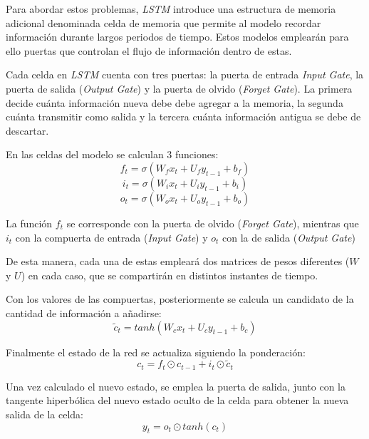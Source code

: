 Para abordar estos problemas, \textit{LSTM} introduce una estructura de memoria adicional denominada
celda de memoria que permite al modelo recordar información durante largos periodos de tiempo. Estos 
modelos emplearán para ello puertas que controlan el flujo de información dentro de estas.

Cada celda en \textit{LSTM} cuenta con tres puertas: la puerta de entrada \textit{Input Gate}, la puerta de salida 
(\textit{Output Gate}) y la puerta de olvido (\textit{Forget Gate}). La primera decide
cuánta información nueva debe debe agregar a la memoria, la segunda cuánta transmitir como salida y 
la tercera cuánta información antigua se debe de descartar.

En las celdas del modelo se calculan 3 funciones:
\begin{equation}
    f_t = \sigma (W_{f} x_t + U_{f} y_{t-1} + b_f)
\end{equation}
\begin{equation}
    i_t = \sigma (W_{i} x_t + U_{i} y_{t-1} + b_i)
\end{equation}
\begin{equation}    
    o_t = \sigma (W_{o} x_t + U_{o} y_{t-1} + b_o)
\end{equation}

La función \(f_t\) se corresponde con la puerta de olvido (\textit{Forget Gate}), mientras que 
\(i_t\) con la compuerta de entrada (\textit{Input Gate}) y \(o_t\) con la de salida (\textit{Output
Gate})

De esta manera, cada una de estas empleará dos matrices de pesos diferentes (\(W\) y \(U\)) en cada caso, que se compartirán
en distintos instantes de tiempo.

Con los valores de las compuertas, posteriormente se calcula un candidato de la cantidad de información
a añadirse:
\begin{equation}
    \widetilde{c}_t = tanh (W_{c} x_t + U_{c} y_{t-1} + b_c) 
\end{equation}

Finalmente el estado de la red se actualiza siguiendo la ponderación:
\begin{equation}
    c_t = f_t \odot  c_{t-1} + i_{t} \odot \widetilde{c}_t 
\end{equation}

Una vez calculado el nuevo estado, se emplea la puerta de salida, junto con la tangente hiperbólica
del nuevo estado oculto de la celda para obtener la nueva salida de la celda:
\begin{equation}
    y_t =  o_t \odot tanh(c_t)
\end{equation}

